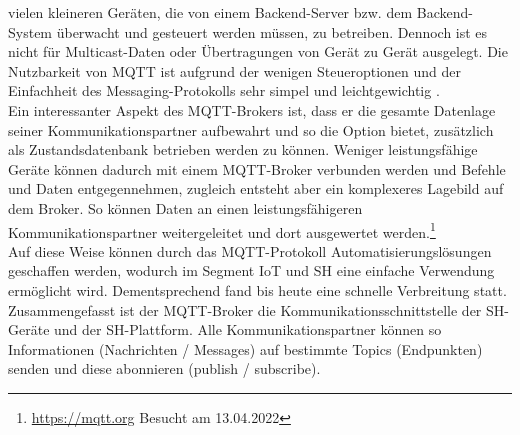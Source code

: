         vielen kleineren Geräten, die von einem Backend-Server bzw. dem Backend-System überwacht und gesteuert werden müssen, zu 
        betreiben. Dennoch ist es nicht für Multicast-Daten oder Übertragungen von Gerät zu Gerät ausgelegt. Die Nutzbarkeit 
        von \acs{MQTT} ist aufgrund der wenigen Steueroptionen und der Einfachheit des Messaging-Protokolls sehr simpel und 
        leichtgewichtig \cite{Naik2017}. 
        \\
        \linebreak
        Ein interessanter Aspekt des \acs{MQTT}-Brokers ist, dass er die gesamte Datenlage seiner Kommunikationspartner aufbewahrt und 
        so die Option bietet, zusätzlich als Zustandsdatenbank betrieben werden zu können. Weniger leistungsfähige Geräte können dadurch  
        mit einem \acs{MQTT}-Broker verbunden werden und Befehle und Daten entgegennehmen, zugleich entsteht aber ein 
        komplexeres Lagebild auf dem Broker. So können Daten an einen leistungsfähigeren Kommunikationspartner 
        weitergeleitet und dort ausgewertet werden.\footnote{\url{https://mqtt.org} Besucht am 13.04.2022}
        \\
        Auf diese Weise können durch das \acl{MQTT}-Protokoll Automatisierungslösungen geschaffen werden, wodurch im Segment 
        \acs{IoT} und \acl{SH} eine einfache Verwendung ermöglicht wird. Dementsprechend fand bis heute eine 
        schnelle Verbreitung statt. 
        \\
        \linebreak
        Zusammengefasst ist der \acs{MQTT}-Broker die Kommunikationsschnittstelle der \acl{SH}-Geräte und der \acl{SH}-Plattform. 
        Alle Kommunikationspartner können so Informationen (Nachrichten / Messages) auf bestimmte Topics (Endpunkten) senden und 
        diese abonnieren (publish / subscribe). 

